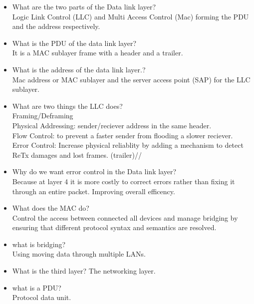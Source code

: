 \begin{itemize}
    \item What are the two parts of the Data link layer?\\
    Logic Link Control (LLC) and Multi Access Control (Mac)
    forming the PDU and the address respectively.\\


    \item What is the PDU of the data link layer?\\
    It is a MAC sublayer frame with a header and a trailer.

    \item What is the address of the data link layer.?\\
    Mac address or MAC sublayer and the server access point (SAP) for the LLC sublayer.


    \item What are two things the LLC does?\\
    Framing/Deframing\\

    Physical Addressing: sender/reciever address in the same header.\\

    Flow Control: to prevent a faster sender from flooding a slower reciever.\\

    Error Control: Increase physical reliablity by adding a mechanism to detect 
    ReTx damages and lost frames. (trailer)//

    \item Why do we want error control in the Data link layer?\\
    Because at layer 4 it is more costly to correct errors rather than fixing it through an 
    entire packet. Improving overall efficency.

    \item What does the MAC do?\\
    Control the access between connected all devices and manage bridging by ensuring that 
    different protocol syntax and semantics are resolved.\\

    \item what is bridging?\\
    Using moving data through multiple LANs.\\

    \item What is the third layer?
    The networking layer.

    \item what is a PDU?\\
    Protocol data unit.


\end{itemize}
